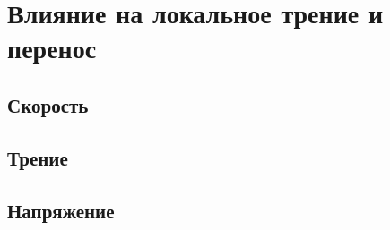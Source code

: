 \section{Влияние на локальное трение и перенос}
\subsection{Скорость}
\subsection{Трение}
\subsection{Напряжение}